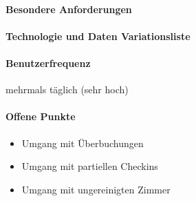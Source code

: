 \paragraph{Besondere Anforderungen}

\paragraph{Technologie und Daten Variationsliste}

\paragraph{Benutzerfrequenz}
mehrmals täglich (sehr hoch)

\paragraph{Offene Punkte}
\begin{itemize}
	\item Umgang mit Überbuchungen
	\item Umgang mit partiellen Checkins
	\item Umgang mit ungereinigten Zimmer
\end{itemize}

\newpage

